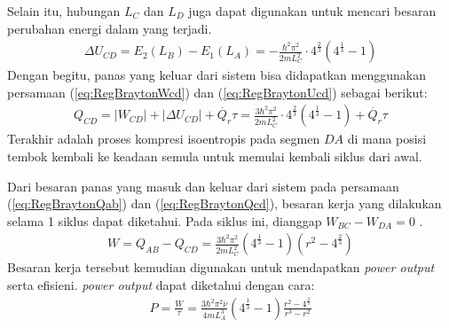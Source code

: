 Selain itu, hubungan  \(L_C\) dan \(L_D\) juga dapat digunakan untuk mencari besaran perubahan energi dalam yang terjadi.
\begin{align}
    \Delta U_{CD} = E_2(L_B) - E_1(L_A) = -\frac{\hbar^2\pi^2}{2mL_C^2}\cdot 4^\frac{2}{3}(4^\frac{1}{3}-1) \label{eq:RegBraytonUcd}
\end{align}
Dengan begitu, panas yang keluar dari sistem bisa didapatkan menggunakan persamaan (\ref{eq:RegBraytonWcd}) dan (\ref{eq:RegBraytonUcd}) sebagai berikut:
\begin{align}
    Q_{CD} = |W_{CD}| + |\Delta U_{CD}| + \dot{Q_r}\tau = \frac{3\hbar^2\pi^2}{2mL_C^2}\cdot 4^\frac{2}{3}(4^\frac{1}{3}-1) + \dot{Q_r}\tau \label{eq:RegBraytonQcd}
\end{align}
Terakhir adalah proses kompresi isoentropis pada segmen \(DA\) di mana posisi tembok kembali ke keadaan semula untuk memulai kembali siklus dari awal. 
\par Dari besaran panas yang masuk dan keluar dari sistem pada persamaan (\ref{eq:RegBraytonQab}) dan (\ref{eq:RegBraytonQcd}), besaran kerja yang dilakukan selama 1 siklus dapat diketahui. Pada siklus ini, dianggap \(W_{BC}-W_{DA}=0\) \cite{MIT_BraytonCycle}. 
\begin{align}
    W = Q_{AB} - Q_{CD} = \frac{3\hbar^2\pi^2}{2mL_C^2}(4^\frac{1}{3} - 1)(r^2 - 4^\frac{2}{3})
\end{align}
Besaran kerja tersebut kemudian digunakan untuk mendapatkan \textit{power output} serta efisieni. \textit{power output} dapat diketahui dengan cara:
\begin{align}
    P = \frac{W}{\tau} =\frac{3\hbar^2\pi^2\overline{\nu}}{4mL_A^3}(4^\frac{1}{3} - 1)\frac{r^2 - 4^\frac{2}{3}}{r^3 - r^2}
\end{align}

